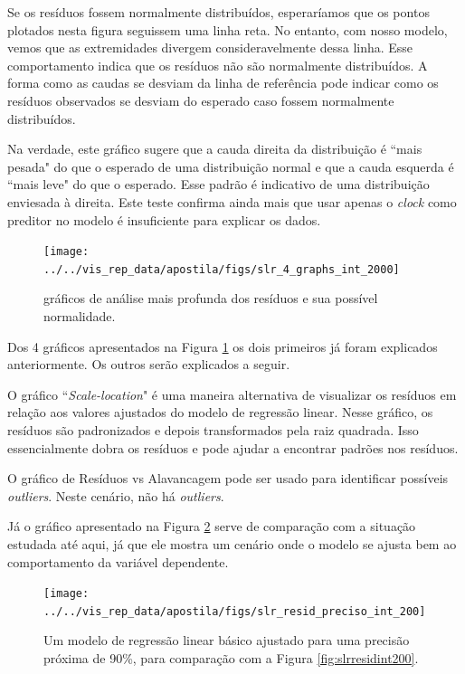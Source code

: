 \documentclass[article]{memoir}
\begin{document}
{Se os resíduos fossem normalmente distribuídos, esperaríamos que os pontos plotados nesta figura seguissem uma linha reta. No entanto, com nosso modelo, vemos que as extremidades divergem consideravelmente dessa linha. Esse comportamento indica que os resíduos não são normalmente distribuídos. A forma como as caudas se desviam da linha de referência pode indicar como os resíduos observados se desviam do esperado caso fossem normalmente distribuídos.

Na verdade, este gráfico sugere que a cauda direita da distribuição é ``mais pesada" do que o esperado de uma distribuição normal e que a cauda esquerda é ``mais leve" do que o esperado. Esse padrão é indicativo de uma distribuição enviesada à direita. Este teste confirma ainda mais que usar apenas o \textit{clock} como preditor no modelo é insuficiente para explicar os dados.



\begin{figure}[ht]
	\centering
	\texttt{[image: ../../vis\_rep\_data/apostila/figs/slr\_4\_graphs\_int\_2000]}
	\caption{gráficos de análise mais profunda dos  resíduos e sua possível normalidade.}
	\label{fig:slr4graphsint2000}
\end{figure}

Dos 4 gráficos apresentados na Figura 	\ref{fig:slr4graphsint2000} os dois primeiros já foram explicados anteriormente.  Os outros serão explicados a seguir.

O gráfico ``\textit{Scale-location}" é uma maneira alternativa de visualizar os resíduos em relação aos valores ajustados do modelo de regressão linear. Nesse gráfico, os resíduos são padronizados e depois transformados pela raiz quadrada. Isso essencialmente dobra os resíduos e pode ajudar a encontrar padrões nos resíduos. 

O gráfico de Resíduos vs Alavancagem pode ser usado para identificar possíveis \textit{outliers}. Neste cenário, não há \textit{outliers}.  

Já o gráfico apresentado na Figura \ref{fig:slrresidprecisoint200} serve de comparação com a situação estudada até aqui, já que ele mostra um cenário onde o modelo se ajusta bem ao comportamento da variável dependente.

\begin{figure}[ht]
	\centering
	\texttt{[image: ../../vis\_rep\_data/apostila/figs/slr\_resid\_preciso\_int\_200]}
	\caption{Um modelo de regressão linear básico ajustado para uma precisão próxima de 90\%, para comparação com a Figura \ref{fig:slrresidint200}.}
	\label{fig:slrresidprecisoint200}
\end{figure}

}
\end{document}
